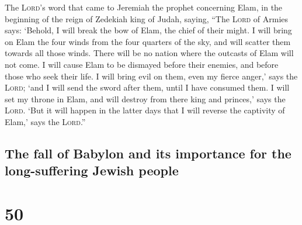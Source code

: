  The \textsc{Lord}'s word that came to Jeremiah the
prophet concerning Elam, in the beginning of the reign of Zedekiah king
of Judah, saying,  ``The \textsc{Lord} of Armies says:
`Behold, I will break the bow of Elam, the chief of their might.
 I will bring on Elam the four winds from the four
quarters of the sky, and will scatter them towards all those winds.
There will be no nation where the outcasts of Elam will not come.
 I will cause Elam to be dismayed before their enemies,
and before those who seek their life. I will bring evil on them, even my
fierce anger,' says the \textsc{Lord}; `and I will send the sword after
them, until I have consumed them.  I will set my throne
in Elam, and will destroy from there king and princes,' says the
\textsc{Lord}.  `But it will happen in the latter days
that I will reverse the captivity of Elam,' says the \textsc{Lord}.''

\hypertarget{the-fall-of-babylon-and-its-importance-for-the-long-suffering-jewish-people}{%
\subsection{The fall of Babylon and its importance for the
long-suffering Jewish
people}\label{the-fall-of-babylon-and-its-importance-for-the-long-suffering-jewish-people}}

\hypertarget{section-49}{%
\section{50}\label{section-49}}

